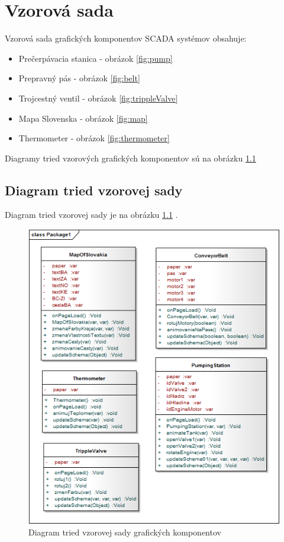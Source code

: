 \chapter{Vzorová sada}

Vzorová sada grafických komponentov SCADA systémov obsahuje:
\begin{itemize}
	\item Prečerpávacia stanica - obrázok \ref{fig:pump}
	\item Prepravný pás - obrázok \ref{fig:belt}
	\item Trojcestný ventil - obrázok \ref{fig:trippleValve}
	\item Mapa Slovenska - obrázok \ref{fig:map}
	\item Thermometer - obrázok \ref{fig:thermometer}
\end{itemize}

Diagramy tried vzorových grafických komponentov sú na obrázku \ref{fig:classD}


\section{Diagram tried vzorovej sady}
Diagram tried vzorovej sady je na obrázku \ref{fig:classD} . 
\begin{figure}[H]
	\centering
	\includegraphics[width=0.9\linewidth]{uml/classDiagramTried.png}
	\caption{Diagram tried vzorovej sady grafických komponentov}
	\label{fig:classD}
\end{figure}


